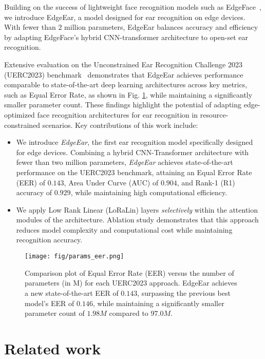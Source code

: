 \documentclass[a4paper, 10pt, conference]{ieeeconf}
\begin{document}
Building on the success of lightweight face recognition models such as EdgeFace~\cite{George_IEEETBIOM_2024}, we introduce EdgeEar, a model designed for ear recognition on edge devices. With fewer than $2$ million parameters, EdgeEar balances accuracy and efficiency by adapting EdgeFace’s hybrid CNN-transformer architecture to open-set ear recognition.

Extensive evaluation on the Unconstrained Ear Recognition Challenge 2023 (UERC2023) benchmark~\cite{uerc2023} demonstrates that EdgeEar achieves performance comparable to state-of-the-art deep learning architectures across key metrics, such as Equal Error Rate, as shown in Fig. \ref{fig:eer_v_modelsize}, while maintaining a significantly smaller parameter count. These findings highlight the potential of adapting edge-optimized face recognition architectures for ear recognition in resource-constrained scenarios. Key contributions of this work include:
\begin{itemize} 
    \item We introduce \textit{EdgeEar}, the first ear recognition model specifically designed for edge devices. Combining a hybrid CNN-Transformer architecture with fewer than two million parameters, \textit{EdgeEar} achieves state-of-the-art performance on the UERC2023 benchmark, attaining an Equal Error Rate (EER) of $0.143$, Area Under Curve (AUC) of $0.904$, and Rank-1 (R1) accuracy of $0.929$, while maintaining high computational efficiency.
    
    \item We apply Low Rank Linear (LoRaLin) layers \textit{selectively} within the attention modules of the architecture. Ablation study demonstrates that this approach reduces model complexity and computational cost while maintaining recognition accuracy.
\end{itemize}


\begin{figure}[ht!]
    \centering
    \texttt{[image: fig/params\_eer.png]}
    \caption{
    Comparison plot of Equal Error Rate (EER) versus the number of parameters (in M) for each UERC2023 approach. EdgeEar achieves a new state-of-the-art EER of $0.143$, surpassing the previous best model's EER of $0.146$, while maintaining a significantly smaller parameter count of $1.98M$ compared to $97.0M$.
    }
    \label{fig:eer_v_modelsize}
\end{figure}
\section{Related work}
\end{document}
